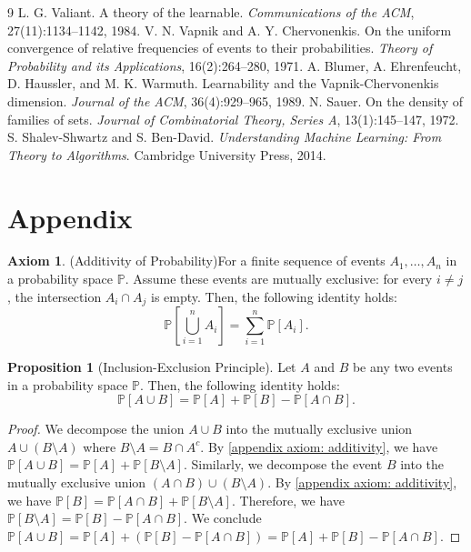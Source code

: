 \documentclass[openany, amssymb, psamsfonts]{amsart}
\theoremstyle{definition}
\numberwithin{equation}{section}
\newtheorem{appendixaxiom}{Axiom}
\newtheorem{appendixprop}{Proposition}
\begin{document}
\begin{thebibliography}{9}
L. G. Valiant. A theory of the learnable. \textit{Communications of the ACM}, 27(11):1134--1142, 1984.
V. N. Vapnik and A. Y. Chervonenkis. On the uniform convergence of relative frequencies of events to their probabilities. \textit{Theory of Probability and its Applications}, 16(2):264--280, 1971.
A. Blumer, A. Ehrenfeucht, D. Haussler, and M. K. Warmuth. Learnability and the Vapnik-Chervonenkis dimension. \textit{Journal of the ACM}, 36(4):929--965, 1989.
N. Sauer. On the density of families of sets. \textit{Journal of Combinatorial Theory, Series A}, 13(1):145--147, 1972.
S. Shalev-Shwartz and S. Ben-David. \textit{Understanding Machine Learning: From Theory to Algorithms}. Cambridge University Press, 2014.

\end{thebibliography}

\clearpage

\section*{Appendix}\label{appendix}
\begin{appendixaxiom}(Additivity of Probability)\label{appendix axiom: additivity}
For a finite sequence of events $A_1, \dots, A_n$ in a probability space $\mathbb{P}$. Assume these events are mutually exclusive: for every $i \ne j$, the intersection $A_i \cap A_j$ is empty. Then, the following identity holds:
\[\mathbb{P}\!\left[\bigcup_{i=1}^{n} A_i\right] = \sum_{i=1}^{n} \mathbb{P}[A_i].\]
\end{appendixaxiom}

\begin{appendixprop}[Inclusion-Exclusion Principle] \label{appendix proposition: inclusion exclusion principle}
Let $A$ and $B$ be any two events in a probability space $\mathbb{P}$. Then, the following identity holds:
\[\mathbb{P}[A \cup B] = \mathbb{P}[A] + \mathbb{P}[B] - \mathbb{P}[A \cap B].\]
\end{appendixprop}
\begin{proof}
We decompose the union $A \cup B$ into the mutually exclusive union $A \cup (B \setminus A)$ where $B \setminus A = B \cap A^c$. By \autoref{appendix axiom: additivity}, we have $\mathbb{P}[A \cup B] = \mathbb{P}[A] + \mathbb{P}[B \setminus A]$. Similarly, we decompose the event $B$ into the mutually exclusive union $(A \cap B) \cup (B \setminus A)$. By \autoref{appendix axiom: additivity}, we have $\mathbb{P}[B] = \mathbb{P}[A \cap B] + \mathbb{P}[B \setminus A]$. Therefore, we have $\mathbb{P}[B \setminus A] = \mathbb{P}[B] - \mathbb{P}[A \cap B]$. We conclude $\mathbb{P}[A \cup B] = \mathbb{P}[A] + \left( \mathbb{P}[B] - \mathbb{P}[A \cap B] \right) = \mathbb{P}[A] + \mathbb{P}[B] - \mathbb{P}[A \cap B]$.
\end{proof}
\end{document}

